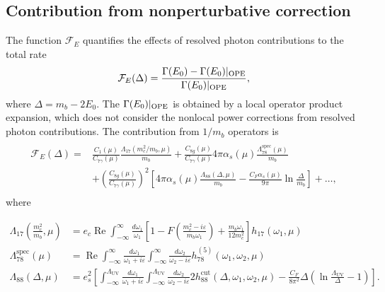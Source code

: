 \subsection{Contribution from nonperturbative correction}\label{sec:nonpert_contr}
The function $\mathcal{F}_E$ quantifies the effects of resolved photon contributions to the total rate \cite{Benzke:2010js}
\begin{eqnarray}
\mathcal{F}_{E}(\Delta)=\frac{\Gamma(E_0)-\Gamma(E_0)|_{\rm{OPE}}}{\Gamma(E_0)|_{\rm{OPE}}},
\end{eqnarray} 
where $\Delta=m_{b}-2 E_{0}$. The $\Gamma(E_0)|_{\rm{OPE}}$ \cite{Misiak:2006zs} is obtained by a local operator product expansion, which does not consider the nonlocal power corrections from resolved photon contributions. The contribution from $1/m_b$ operators is
\begin{eqnarray}\label{eqn:chapter3_resolved_photon_err}
\begin{aligned}
\begin{aligned}
\mathcal{F}_{E}(\Delta)=& \frac{C_{1}(\mu)}{C_{7 \gamma}(\mu)} \frac{\Lambda_{17}\left(m_{c}^{2} / m_{b}, \mu\right)}{m_{b}}+\frac{C_{8 g}(\mu)}{C_{7 \gamma}(\mu)} 4 \pi \alpha_{s}(\mu) \frac{\Lambda_{78}^{\mathrm{spec}}(\mu)}{m_{b}} \\
&+\left(\frac{C_{8 g}(\mu)}{C_{7 \gamma}(\mu)}\right)^{2}\left[4 \pi \alpha_{s}(\mu) \frac{\Lambda_{88}(\Delta, \mu)}{m_{b}}-\frac{C_{F} \alpha_{s}(\mu)}{9 \pi} \ln \frac{\Delta}{m_{b}}\right]+\ldots,
\end{aligned}
\end{aligned}
\end{eqnarray}
where 

\begin{align}\label{eqn:chapter3_soft_functions}
\Lambda_{17}\left(\frac{m_{c}^{2}}{m_{b}}, \mu\right) &=e_{c} \operatorname{Re} \int_{-\infty}^{\infty} \frac{d \omega_{1}}{\omega_{1}}\left[1-F\left(\frac{m_{c}^{2}-i \varepsilon}{m_{b} \omega_{1}}\right)+\frac{m_{b} \omega_{1}}{12 m_{c}^{2}}\right] h_{17}\left(\omega_{1}, \mu\right)\nonumber \\
\Lambda_{78}^{\mathrm{spec}}(\mu) &=\operatorname{Re} \int_{-\infty}^{\infty} \frac{d \omega_{1}}{\omega_{1}+i \varepsilon} \int_{-\infty}^{\infty} \frac{d \omega_{2}}{\omega_{2}-i \varepsilon} h_{78}^{(5)}\left(\omega_{1}, \omega_{2}, \mu\right)\nonumber \\
\Lambda_{88}(\Delta, \mu) &=e_{s}^{2}\left[\int_{-\infty}^{\Lambda_{\mathrm{UV}}} \frac{d \omega_{1}}{\omega_{1}+i \varepsilon} \int_{-\infty}^{\Lambda_{\mathrm{UV}}} \frac{d \omega_{2}}{\omega_{2}-i \varepsilon} 2 h_{88}^{\mathrm{cut}}\left(\Delta, \omega_{1}, \omega_{2}, \mu\right)-\frac{C_{F}}{8 \pi^{2}} \Delta\left(\ln \frac{\Lambda_{\mathrm{UV}}}{\Delta}-1\right)\right].
\end{align}

